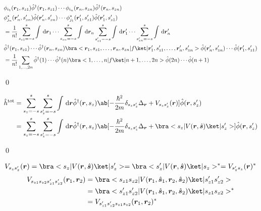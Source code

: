 \documentclass[uplatex,dvipdfmx,a4paper,11pt]{jlreq}
\makeatletter
\newcommand{\rr}{\bm{r}}
\renewcommand{\ss}{\bm{s}}
\numberwithin{equation}{section}
\theoremstyle{definition}
\renewenvironment{proof}[1][\proofname]{\par
  \normalfont
  \topsep6\p@\@plus6\p@ \trivlist
  \item[\hskip\labelsep{\bfseries #1}\@addpunct{\bfseries}]\ignorespaces\quad\par
}{
  \qed\endtrivlist\@endpefalse
}
\renewcommand\proofname{証明}
\makeatother
\begin{document}
\begin{proof}
\begin{align}
                           & \phi_{i_1}(\rr_1, s_{z1})\hat{\phi}^\dagger(\rr_1, s_{z1})\cdots\phi_{i_n}(\rr_n, s_{zn})\hat{\phi}^\dagger(\rr_n, s_{zn})                                                                                            \\
                           & \phi_{j_n}^*(\rr_n', s_{zn}')\hat{\phi}(\rr_n', s_{zn}')\cdots\phi_{j_1}^*(\rr_1', s_{z1}')\hat{\phi}(\rr_1', s_{z1}')                                                                                                \\
                           & = \frac{1}{n!}\sum_{s_{z1} = -s}^s\int\dl{\rr_1}\cdots\sum_{s_{zn} = -s}^s\int\dl{\rr_n}\sum_{s_{z1}' = -s}^s\int\dl{\rr_1'}\cdots\sum_{s_{zn}' = -s}^s\int\dl{\rr_n'}                                                \\
                           & \hat{\phi}^\dagger(\rr_1, s_{z1})\cdots\hat{\phi}^\dagger(\rr_n, s_{zn})\bra<\rr_1,s_{z1},\ldots,\rr_n,s_{zn}|f\ket|\rr_1',s_{z1}',\ldots,\rr_n',s_{zn}'>\hat{\phi}(\rr_n', s_{zn}')\cdots\hat{\phi}(\rr_1', s_{z1}') \\
                           & = \frac{1}{n!}\sum_{1,\ldots,2n}\hat{\phi}^\dagger(1)\cdots\hat{\phi}^\dagger(n)\bra<1,\ldots,n|f\ket|n+1,\ldots,2n>\hat{\phi}(2n)\cdots\hat{\phi}(n+1)
  \end{align}
\end{proof}

\begin{theorem}

\end{theorem}
\begin{proof}
  \begin{align}
    \hat{h}^{\mathrm{tot}} & = \sum_{s_z = -s}^{s}\sum_{s_z' = -s}^{s}\int\dl{\rr}\hat{\phi}^\dagger(\rr, s_z)\ab[-\frac{\hbar^2}{2m}\delta_{s_zs_z'}\Delta_{\rr} + V_{s_zs_z'}(\rr)]\hat{\phi}(\rr, s_z')                     \\
                           & = \sum_{s_z = -s}^{s}\sum_{s_z' = -s}^{s}\int\dl{\rr}\hat{\phi}^\dagger(\rr, s_z)\ab[-\frac{\hbar^2}{2m}\delta_{s_zs_z'}\Delta_{\rr} + \bra<s_z|V(\rr, \hat{\ss})\ket|s_z'>]\hat{\phi}(\rr, s_z')
  \end{align}
\end{proof}

\begin{align}
  V_{s_zs_z'}(\rr) = \bra<s_z|V(\rr, \hat{\ss})\ket|s_z'> = \bra<s_z'|V(\rr, \hat{\ss})\ket|s_z>^* = V_{s_z's_z}(\rr)^*
\end{align}
\begin{align}
  V_{s_{z1}s_{z2}s_{z1}'s_{z2}'}(\rr_1, \rr_2) & = \bra<s_{z1}s_{z2}|V(\rr_1, \hat{\ss}_1, \rr_2, \hat{\ss}_2)\ket|s_{z1}'s_{z2}'>   \\
                                               & = \bra<s_{z1}'s_{z2}'|V(\rr_1, \hat{\ss}_1, \rr_2, \hat{\ss}_2)\ket|s_{z1}s_{z2}>^* \\
                                               & = V_{s_{z1}'s_{z2}'s_{z1}s_{z2}}(\rr_1, \rr_2)^*
\end{align}
\end{document}
